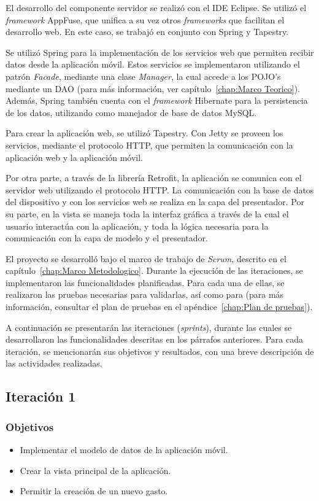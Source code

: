 El desarrollo del componente servidor se realizó con el IDE Eclipse. Se utilizó el \textit{framework} AppFuse, que unifica a su vez otros \textit{frameworks} que facilitan el desarrollo web. En este caso, se trabajó en conjunto con Spring y Tapestry.

Se utilizó Spring para la implementación de los servicios web que permiten recibir datos desde la aplicación móvil. Estos servicios se implementaron utilizando el patrón \textit{Facade}, mediante una clase \textit{Manager}, la cual accede a los POJO's mediante un DAO (para más información, ver capítulo~\ref{chap:Marco Teorico}). Además, Spring también cuenta con el \textit{framework} Hibernate para la persistencia de los datos, utilizando como manejador de base de datos MySQL.

Para crear la aplicación web, se utilizó Tapestry. Con Jetty se proveen los servicios, mediante el protocolo HTTP, que permiten la comunicación con la aplicación web y la aplicación  móvil.

Por otra parte, a través de la librería Retrofit, la aplicación se comunica con el servidor web utilizando el protocolo HTTP. La comunicación con la base de datos del dispositivo y con los servicios web se realiza en la capa del presentador. Por su parte, en la vista se maneja toda la interfaz gráfica a través de la cual el usuario interactúa con la aplicación, y toda la lógica necesaria para la comunicación con la capa de modelo y el presentador.

El proyecto se desarrolló bajo el marco de trabajo de \textit{Scrum}, descrito en el capítulo~\ref{chap:Marco Metodologico}. Durante la ejecución de las iteraciones, se implementaron las funcionalidades planificadas. Para cada una de ellas, se realizaron las pruebas necesarias para validarlas, así como para (para más información, consultar el plan de pruebas en el apéndice~\ref{chap:Plan de pruebas}). 

A continuación se presentarán las iteraciones (\textit{sprints}), durante las cuales se desarrollaron las funcionalidades descritas en los párrafos anteriores. Para cada iteración, se mencionarán sus objetivos y resultados, con una breve descripción de las actividades realizadas.

\subsection{Iteración 1}

\subsubsection{Objetivos}
	\begin{itemize}
  \item Implementar el modelo de datos de la aplicación móvil.
	\item Crear la vista principal de la aplicación.
	\item Permitir la creación de un nuevo gasto.
	\end{itemize}

